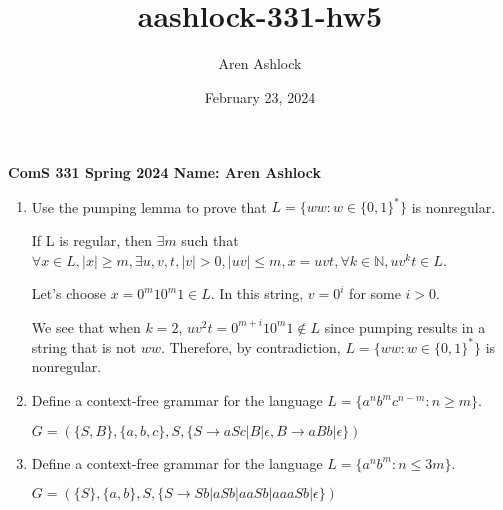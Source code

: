 \documentclass[12pt]{article}
\title{aashlock-331-hw5}
\author{Aren Ashlock}
\date{February 23, 2024}
\begin{document}
\noindent\textbf{ComS 331 \quad Spring 2024 \quad Name: Aren Ashlock}

\begin{enumerate}


\item Use the pumping lemma to prove that $L = \{ww : w \in \{0, 1\}^*\}$ is nonregular.

\color{blue} If L is regular, then $\exists m$ such that $\forall x \in L, |x| \geq m, \exists u, v, t, |v| > 0, |uv| \leq m, x = uvt, \forall k \in \mathbb{N}, uv^kt \in L$.

Let's choose $x = 0^m10^m1 \in L$. In this string, $v = 0^i$ for some $i > 0$.

We see that when $k = 2$, $uv^2t = 0^{m + i}10^m1 \notin L$ since pumping results in a string that is not $ww$. Therefore, by contradiction, $L = \{ww : w \in \{0, 1\}^*\}$ is nonregular. \color{black}



\item Define a context-free grammar for the language $L = \{a^nb^mc^{n-m} : n \geq m\}$.

\color{blue} $G = (\{S, B\}, \{a, b, c\}, S, \{S \rightarrow aSc|B|\epsilon, B \rightarrow aBb|\epsilon\})$ \color{black}



\item Define a context-free grammar for the language $L = \{a^nb^m : n \leq 3m\}$.

\color{blue} $G = (\{S\}, \{a, b\}, S, \{S \rightarrow Sb|aSb|aaSb|aaaSb|\epsilon\})$ \color{black}


\end{enumerate}
\end{document}

